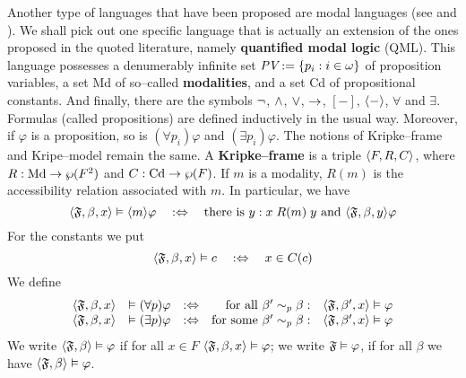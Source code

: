 Another type of languages that have been proposed are modal
languages (see \cite{blackburn:avstructures} and
\cite{kracht:av}). We shall pick out one specific language that 
is actually an extension of the ones proposed in the quoted 
literature, namely \textbf{quantified modal logic} (QML). 
This language possesses a denumerably infinite set $\mbox{\it PV} 
:= \{p_i : i \in \omega\}$ of proposition variables, a set {\rm Md} of 
so--called \textbf{modalities}, and a set {\rm Cd} of propositional constants. 
And finally, there are the symbols $\neg$, $\wedge$, $\vee$, $\rightarrow$, 
$[-]$, $\langle -\rangle$, $\forall$ and $\exists$. Formulas (called 
propositions) are defined inductively in the usual way. Moreover, 
if $\varphi$ is a proposition, so is $(\forall p_i)\varphi$ and
$(\exists p_i)\varphi$.
The notions of Kripke--frame and Kripe--model remain the same.
A \textbf{Kripke--frame} is a triple $\langle F, R, C\rangle$, where 
$R : \mbox{\rm Md} \rightarrow \wp(F^2)$ and $C : \mbox{\rm Cd} \rightarrow \wp(F)$.
If $m$ is a modality, $R(m)$ is the accessibility relation 
associated with $m$. In particular, we have 
\begin{equation}
\langle \mathfrak{F}, \beta, x\rangle \vDash \langle m\rangle \varphi \quad:\Leftrightarrow\quad
\text{there is }y: x\; R(m)\; y \text{ and } \langle \mathfrak{F}, \beta, y\rangle 
	\varphi
\end{equation}
For the constants we put
\begin{equation}
\langle \mathfrak{F}, \beta, x\rangle \vDash c \quad:\Leftrightarrow\quad x \in C(c)
\end{equation}
We define
\begin{equation}
\begin{array}{rl@{\quad :\Dpf \quad}rl}
\auf \GF, \beta, x\zu & \vDash (\forall p)\varphi   &
    \text{for all }\beta' \sim_p \beta:
    & \auf \GF, \beta', x\zu \vDash \varphi \\
\auf \GF, \beta, x\zu & \vDash (\exists p)\varphi &
    \text{for some }\beta' \sim_p \beta:
    & \auf \GF, \beta', x\zu \vDash \varphi
\end{array}$$
\end{equation}
We write $\langle \mathfrak{F}, \beta\rangle \vDash \varphi$ if for all $x \in F$
$\langle \mathfrak{F}, \beta,x\rangle \vDash \varphi$; we write $\mathfrak{F} \vDash \varphi$,
if for all $\beta$ we have $\langle \mathfrak{F}, \beta\rangle \vDash \varphi$.

